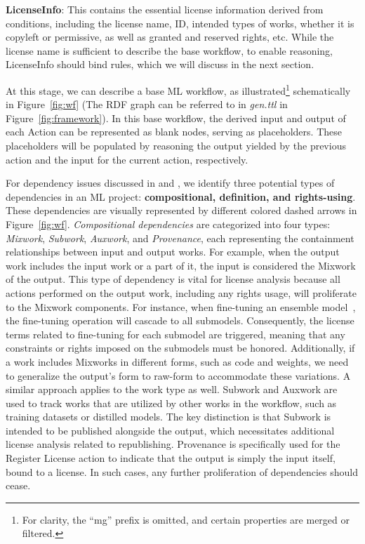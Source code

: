 \textbf{LicenseInfo}: This contains the essential license information derived from conditions, including the license name, ID, intended types of works, whether it is copyleft or permissive, as well as granted and reserved rights, etc.
While the license name is sufficient to describe the base workflow, to enable reasoning, LicenseInfo should bind rules, which we will discuss in the next section.

At this stage, we can describe a base ML workflow, as illustrated\footnote{For clarity, the “mg” prefix is omitted, and certain properties are merged or filtered.} schematically in Figure~\ref{fig:wf} (The RDF graph can be referred to in \emph{gen.ttl} in Figure~\ref{fig:framework}).
In this base workflow, the derived input and output of each Action can be represented as blank nodes, serving as placeholders. 
These placeholders will be populated by reasoning the output yielded by the previous action and the input for the current action, respectively.

For dependency issues discussed in  and , we identify three potential types of dependencies in an ML project: \textbf{compositional, definition, and rights-using}. These dependencies are visually represented by different colored dashed arrows in Figure~\ref{fig:wf}.
\emph{Compositional dependencies} are categorized into four types: \emph{Mixwork}, \emph{Subwork}, \emph{Auxwork}, and \emph{Provenance}, each representing the containment relationships between input and output works.
For example, when the output work includes the input work or a part of it, the input is considered the Mixwork of the output. 
This type of dependency is vital for license analysis because all actions performed on the output work, including any rights usage, will proliferate to the Mixwork components.
For instance, when fine-tuning an ensemble model~\cite{furlanello2018born}, the fine-tuning operation will cascade to all submodels. 
Consequently, the license terms related to fine-tuning for each submodel are triggered, meaning that any constraints or rights imposed on the submodels must be honored. 
Additionally, if a work includes Mixworks in different forms, such as code and weights, we need to generalize the output's form to raw-form to accommodate these variations.
A similar approach applies to the work type as well.
Subwork and Auxwork are used to track works that are utilized by other works in the workflow, such as training datasets or distilled models. 
The key distinction is that Subwork is intended to be published alongside the output, which necessitates additional license analysis related to republishing.
Provenance is specifically used for the Register License action to indicate that the output is simply the input itself, bound to a license. In such cases, any further proliferation of dependencies should cease.

